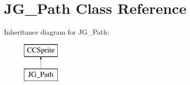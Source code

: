 \hypertarget{class_j_g___path}{\section{J\-G\-\_\-\-Path Class Reference}
\label{class_j_g___path}
}
Inheritance diagram for J\-G\-\_\-\-Path\-:\begin{figure}[H]
\begin{center}
\leavevmode
\includegraphics[height=2.000000cm]{class_j_g___path}
\end{center}
\end{figure}
